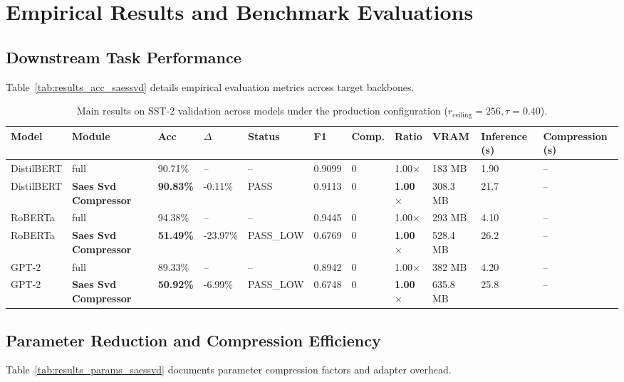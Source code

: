 \section{Empirical Results and Benchmark Evaluations}

\subsection{Downstream Task Performance}
Table~\ref{tab:results_acc_saessvd} details empirical evaluation metrics across target backbones.

\begin{table}[t]
\centering
\small
\begin{tabular}{lllllllllll}
\toprule
\textbf{Model} & \textbf{Module} & \textbf{Acc} & \textbf{$\Delta$} & \textbf{Status} & \textbf{F1} & \textbf{Comp.} & \textbf{Ratio} & \textbf{VRAM} & \textbf{Inference (s)} & \textbf{Compression (s)} \\
\midrule
DistilBERT & full & 90.71\% & -- & -- & 0.9099 & 0 & 1.00$\times$ & 183 MB & 1.90 & -- \\
DistilBERT & \textbf{Saes Svd Compressor} & \textbf{90.83\%} & -0.11\% & PASS & 0.9113 & 0 & \textbf{1.00$\times$} & 308.3 MB & 21.7 & -- \\
RoBERTa & full & 94.38\% & -- & -- & 0.9445 & 0 & 1.00$\times$ & 293 MB & 4.10 & -- \\
RoBERTa & \textbf{Saes Svd Compressor} & \textbf{51.49\%} & -23.97\% & PASS_LOW & 0.6769 & 0 & \textbf{1.00$\times$} & 528.4 MB & 26.2 & -- \\
GPT-2 & full & 89.33\% & -- & -- & 0.8942 & 0 & 1.00$\times$ & 382 MB & 4.20 & -- \\
GPT-2 & \textbf{Saes Svd Compressor} & \textbf{50.92\%} & -6.99\% & PASS_LOW & 0.6748 & 0 & \textbf{1.00$\times$} & 635.8 MB & 25.8 & -- \\
\bottomrule
\end{tabular}
\caption{Main results on SST-2 validation across models under the production configuration ($r_{\mathrm{ceiling}}=256, \tau=0.40$).}
\label{tab:main_sst2}
\end{table}

\subsection{Parameter Reduction and Compression Efficiency}
Table~\ref{tab:results_params_saessvd} documents parameter compression factors and adapter overhead.


